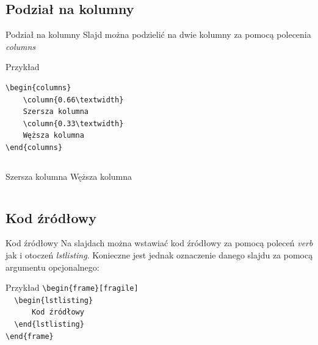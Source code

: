 \documentclass{beamer}
\begin{document}
\subsection{Podział na kolumny}
\begin{frame}[fragile]{Podział na kolumny}
	Slajd można podzielić na dwie kolumny za pomocą polecenia \emph{columns}
	\begin{block}{Przykład}
		\begin{lstlisting}
\begin{columns}
	\column{0.66\textwidth}
	Szersza kolumna
	\column{0.33\textwidth}
	Węższa kolumna
\end{columns}
		\end{lstlisting}
	\end{block}
	\begin{columns}
		Szersza kolumna
		Węższa kolumna
	\end{columns}
\end{frame}

\subsection{Kod źródłowy}
\begin{frame}[fragile]{Kod źródłowy}
	Na slajdach można wstawiać kod źródłowy za pomocą poleceń \emph{verb} jak i otoczeń \emph{lstlisting}. Konieczne jest jednak oznaczenie danego slajdu za pomocą argumentu opcjonalnego:
	
	\begin{block}{Przykład}
	\verb|\begin{frame}[fragile]|\\
	\verb|	\begin{lstlisting}|\\
	\verb|		Kod źródłowy|\\
	\verb|	\end{lstlisting}|\\
	\verb|\end{frame}|
	\end{block}
\end{frame}
\end{document}
